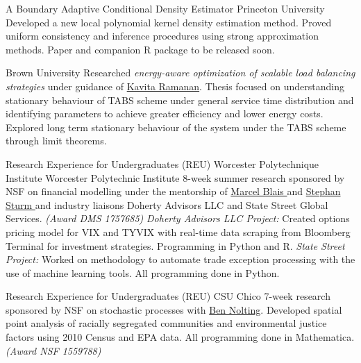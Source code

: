 \documentclass[10pt,a4paper,roman]{moderncv}        %
\begin{document}
{A Boundary Adaptive Conditional Density Estimator}
{Princeton University}{}
{Developed a new local polynomial kernel density estimation method.
  Proved uniform consistency and inference procedures using strong approximation
  methods.
  Paper and companion R package to be released soon.}

{Brown University}{}
{Researched \textit{energy-aware optimization of scalable load balancing
  strategies} under guidance of 
\color{blue}\href{https://www.brown.edu/academics/applied-mathematics/faculty/kavita-ramanan/home}{Kavita
  Ramanan}\color{black}.
Thesis focused on understanding stationary behaviour of TABS scheme
under general service time distribution and identifying parameters
to achieve greater efficiency and lower energy costs.
Explored long term stationary behaviour of the system under the TABS scheme through limit theorems.}

{Research Experience for Undergraduates (REU) }
{Worcester Polytechnique Institute}
{Worcester Polytechnic Institute}
{8-week summer research sponsored by NSF on financial modelling under the
  mentorship of
  \color{blue}\href{https://www.wpi.edu/people/faculty/myblais}{Marcel Blais
  }\color{black}
  and \color{blue}\href{https://www.wpi.edu/people/faculty/ssturm}{Stephan Sturm
  }\color{black}
  and industry liaisons Doherty Advisors LLC and State Street Global Services.
  \textit{(Award DMS 1757685)}
  \newline{}%
\textit{Doherty Advisors LLC Project:}
Created options pricing model for VIX and TYVIX with real-time data scraping
from Bloomberg Terminal for investment strategies.
Programming in Python and R.
\newline{}
\textit{State Street Project:}
Worked on methodology to automate trade exception processing with the use of
machine learning tools. All programming done in Python.
}

{Research Experience for Undergraduates (REU)}
{CSU Chico}{}
{7-week research sponsored by NSF on stochastic processes with
  \href{http://www.bennolting.org}{Ben Nolting}.
  Developed spatial point analysis of racially segregated communities
  and environmental justice factors using 2010 Census and EPA data.
  All programming done in Mathematica. \textit{(Award NSF 1559788)}}
\end{document}
